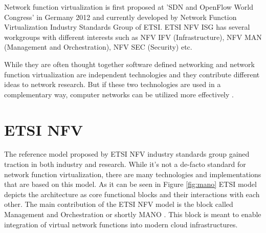 \documentclass[12pt,oneandhalf,chaparabic,ceng,ms,eng,oneside,pntc]{gsufbe}
\begin{document}
Network function virtualization is first proposed at 'SDN and OpenFlow World Congress' in
Germany 2012 and currently developed by Network Function Virtualization Industry Standards Group of
ETSI. ETSI NFV ISG has several workgroups with different interests such as NFV IFV (Infrastructure),
NFV MAN (Management and Orchestration), NFV SEC (Security) etc. \cite{ntt_nfv}

While they are often thought together software defined networking and network function virtualization
are independent technologies and they contribute different ideas to network research. But if these two
technologies are used in a complementary way, computer networks can be utilized more effectively
\cite{gray_network_2016}.

\section{ETSI NFV}
The reference model \cite{etsi_nfv} proposed by ETSI NFV industry standards group gained traction
in both industry and
research. While it's not a de-facto standard for network function virtualization, there are many
technologies and implementations that are based on this model. As it can be seen in Figure \ref{fig:mano}
ETSI model depicts the architecture as core functional blocks and their interactions with each other. 
The main contribution of the ETSI NFV model is the block called Management and Orchestration or shortly
MANO \cite{etsi_nfvman}. This block is meant to enable integration of virtual network functions 
into modern cloud
infrastructures.
\end{document}
